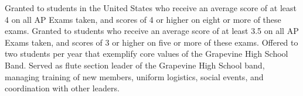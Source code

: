 \documentclass[
    10pt,
    A4,
    english,
    draft = false,
    twoside = false,
]{article}
\begin{document}
	{Granted to students in the United States who receive an average score of at least 4 on all AP Exams taken, and scores of 4 or higher on eight or more of these exams.}
	{Granted to students who receive an average score of at least 3.5 on all AP Exams taken, and scores of 3 or higher on five or more of these exams.}
	{Offered to two students per year that exemplify core values of the Grapevine High School Band.}
	{Served as flute section leader of the Grapevine High School band, managing training of new members, uniform logistics, social events, and coordination with other leaders.}
\end{document}
